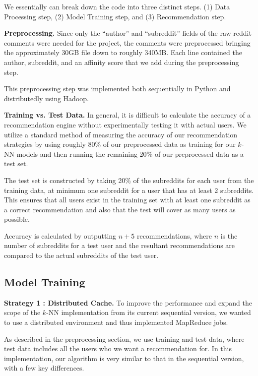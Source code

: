\documentclass[conference, 12pt]{IEEEtran}
\begin{document}
We essentially can break down the code into three distinct steps. (1) Data Processing step, (2) Model Training step, and (3) Recommendation step.

\textbf{Preprocessing.} Since only the \enquote{author} and \enquote{subreddit} fields of the raw reddit comments were needed for the project, the comments were preprocessed bringing the approximately 30GB file down to roughly 340MB.  Each line contained the author, subreddit, and an affinity score that we add during the preprocessing step.

This preprocessing step was implemented both sequentially in Python and distributedly using Hadoop.


\textbf{Training vs. Test Data.} In general, it is difficult to calculate the accuracy of a recommendation engine without experimentally testing it with actual users.  We utilize a standard method of measuring the accuracy of our recommendation strategies by using roughly 80\% of our preprocessed data as training for our $k$-NN models and then running the remaining 20\% of our preprocessed data as a test set.

The test set is constructed by taking 20\% of the subreddits for each user from the training data, at minimum one subreddit for a user that has at least 2 subreddits.  This ensures that all users exist in the training set with at least one subreddit as a correct recommendation and also that the test will cover as many users as possible.

Accuracy is calculated by outputting $n+5$ recommendations, where $n$ is the number of subreddits for a test user and the resultant recommendations are compared to the actual subreddits of the test user.


\subsection{Model Training}
\textbf{Strategy 1 : Distributed Cache.} To improve the performance and expand the scope of the $k$-NN implementation from its current sequential version, we wanted to use a distributed environment and thus implemented MapReduce jobs. 

As described in the preprocessing section, we use training and test data, where test data includes all the users who we want a recommendation for. In this implementation, our algorithm is very similar to that in the sequential version, with a few key differences.
\end{document}
